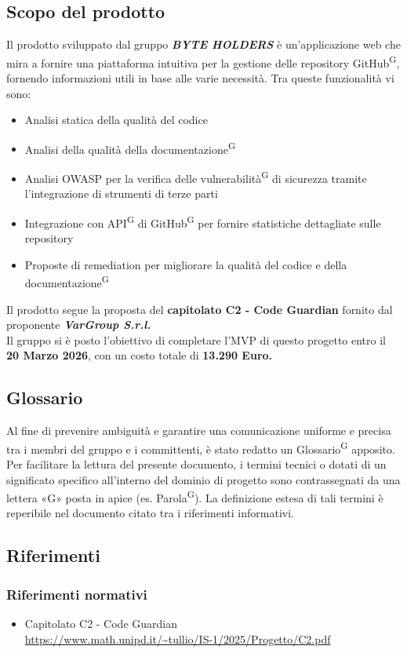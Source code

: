 \documentclass[a4paper, 11pt]{article}
\begin{document}
\subsection{Scopo del prodotto}
Il prodotto sviluppato dal gruppo \textbf{\textit{BYTE HOLDERS}} è un'applicazione web che mira a fornire una piattaforma intuitiva per la gestione delle repository GitHub\textsuperscript{G}, 
fornendo informazioni utili in base alle varie necessità.
Tra queste funzionalità vi sono:
\begin{itemize}
    \item Analisi statica della qualità del codice
    \item Analisi della qualità della documentazione\textsuperscript{G}
    \item Analisi OWASP per la verifica delle vulnerabilità\textsuperscript{G} di sicurezza tramite l'integrazione di strumenti di terze parti
    \item Integrazione con API\textsuperscript{G} di GitHub\textsuperscript{G} per fornire statistiche dettagliate sulle repository
    \item Proposte di remediation per migliorare la qualità del codice e della documentazione\textsuperscript{G}
\end{itemize}
Il prodotto segue la proposta del \textbf{capitolato C2 - Code Guardian} fornito dal proponente \textbf{\textit{VarGroup S.r.l.}}
\\
Il gruppo si è posto l'obiettivo di completare l'MVP di questo progetto entro il \textbf{20 Marzo 2026}, con un costo totale di \textbf{13.290 Euro.}

\subsection{Glossario}
Al fine di prevenire ambiguità e garantire una comunicazione uniforme e precisa tra i membri del gruppo e i committenti, è stato redatto un Glossario\textsuperscript{G} apposito.
Per facilitare la lettura del presente documento, i termini tecnici o dotati di un significato specifico all'interno del dominio di progetto sono contrassegnati da una lettera «G» posta in apice (es. Parola\textsuperscript{G}).
La definizione estesa di tali termini è reperibile nel documento citato tra i riferimenti informativi.

\subsection{Riferimenti}
\subsubsection{Riferimenti normativi}
\begin{itemize}
    \item 
		Capitolato C2 - Code Guardian\\
		\url{https://www.math.unipd.it/~tullio/IS-1/2025/Progetto/C2.pdf}
\end{itemize}
\end{document}
